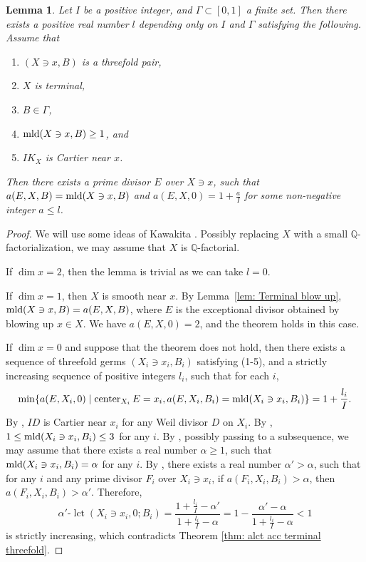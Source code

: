 \documentclass[11pt]{amsart}
\numberwithin{equation}{section}
\newcommand{\Qq}{\mathbb{Q}}
\newcommand{\Center}{\operatorname{center}}
\newcommand{\mld}{{\rm{mld}}}
\newcommand{\lct}{\operatorname{lct}}
\newcommand{\Ii}{{\Gamma}}
\newtheorem{lem}[thm]{Lemma}
\theoremstyle{definition}
\theoremstyle{definition}
\begin{document}
\begin{lem}\label{lem: nak ter 3fold finite coefficient bdd index}
Let $I$ be a positive integer, and $\Ii\subset [0,1]$ a finite set. Then there exists a positive real number $l$ depending only on $I$ and $\Ii$ satisfying the following. Assume that
\begin{enumerate}
    \item $(X\ni x,B)$ is a threefold pair,
    \item $X$ is terminal,
    \item $B\in\Ii$,
    \item $\mld(X\ni x,B)\geq 1$, and
    \item $IK_X$ is Cartier near $x$.
\end{enumerate}
Then there exists a prime divisor $E$ over $X\ni x$, such that $a(E,X,B)=\mld(X\ni x,B)$ and $a(E,X,0)=1+\frac{a}{I}$ for some non-negative integer $a\leq l$.
\end{lem}
\begin{proof}
We will use some ideas of Kawakita \cite[Theorem 4.6]{Kaw21}. Possibly replacing $X$ with a small $\Qq$-factorialization, we may assume that $X$ is $\Qq$-factorial. 

If $\dim x=2$, then the lemma is trivial as we can take $l=0$.

If $\dim x=1$, then $X$ is smooth near $x$. By Lemma~\ref{lem: Terminal blow up}, $\mld(X\ni x, B)=a(E,X,B)$, where $E$ is the exceptional divisor obtained by blowing up $x\in X$. We have $a(E,X,0)=2$, and the theorem holds in this case.

If $\dim x=0$ and suppose that the theorem does not hold, then there exists a sequence of threefold germs $(X_i\ni x_i,B_i)$ satisfying (1-5), and a strictly increasing sequence of positive integers $l_i$, such that for each $i$,
  $$\min\{a(E,X_i,0)\mid \Center_{X_i}E=x_i,a(E,X_i,B_i)=\mld(X_i\ni x_i,B_i)\}=1+\frac{l_i}{I}.$$
By \cite[Lemma 5.1]{Kaw88}, $ID$ is Cartier near $x_i$ for any Weil divisor $D$ on $X_i$. By \cite[Theorem 0.1]{Amb99}, $1\leq\mld(X_i\ni x_i,B_i)\leq 3$ for any $i$. By \cite[Corollary 1.3]{Nak16}, possibly passing to a subsequence, we may assume that there exists a real number $\alpha\geq 1$, such that $\mld(X_i\ni x_i,B_i)=\alpha$ for any $i$. By \cite[Theorem 1.2]{Nak16}, there exists a real number $\alpha'>\alpha$, such that for any $i$ and any prime divisor $F_i$ over $X_i\ni x_i$, if $a(F_i,X_i,B_i)>\alpha$, then $a(F_i,X_i,B_i)>\alpha'$. Therefore,
$$\alpha'\text{-}\lct(X_i\ni x_i,0;B_i)=\frac{1+\frac{l_i}{I}-\alpha'}{1+\frac{l_i}{I}-\alpha}=1-\frac{\alpha'-\alpha}{1+\frac{l_i}{I}-\alpha}<1$$
is strictly increasing, which contradicts Theorem \ref{thm: alct acc terminal threefold}.
\end{proof}
\end{document}

